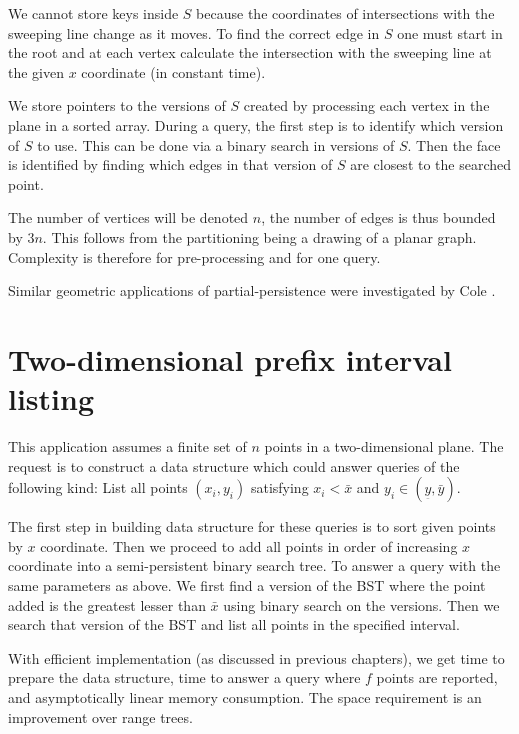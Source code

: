 We cannot store keys inside $S$ because the coordinates of intersections with the sweeping line change as it moves. To find the correct edge in $S$ one must start in the root and at each vertex calculate the intersection with the sweeping line at the given $x$ coordinate (in constant time).

We store pointers to the versions of $S$ created by processing each vertex in the plane in a sorted array. During a query, the first step is to identify which version of $S$ to use. This can be done via a binary search in versions of $S$. Then the face is identified by finding which edges in that version of $S$ are closest to the searched point.

The number of vertices will be denoted $n$, the number of edges is thus bounded by $3n$. This follows from the partitioning being a drawing of a planar graph. Complexity is therefore  for pre-processing and  for one query.

Similar geometric applications of partial-persistence were investigated by Cole \cite{geometric-applications}.




\section{Two-dimensional prefix interval listing}

This application assumes a finite set of $n$ points in a two-dimensional plane. The request is to construct a data structure which could answer queries of the following kind: List %
all points $(x_i,y_i)$ satisfying $x_i < \bar x$ and $ y_i \in (\underset{\bar{}}{y}, \bar y) $.

The first step in building data structure for these queries is to sort given points by $x$ coordinate. Then we proceed to add all points in order of increasing $x$ coordinate into a semi-persistent binary search tree. To answer a query with the same parameters as above. We first find a version of the BST where the point added is the greatest lesser than $\bar x$ using binary search on the versions. Then we search that version of the BST and list all points in the specified interval.

With efficient implementation (as discussed in previous chapters), we get  time to prepare the data structure,  time to answer a query where $f$ points are reported, and asymptotically linear memory consumption. The space requirement is an improvement over range trees\cite{range-trees}.


